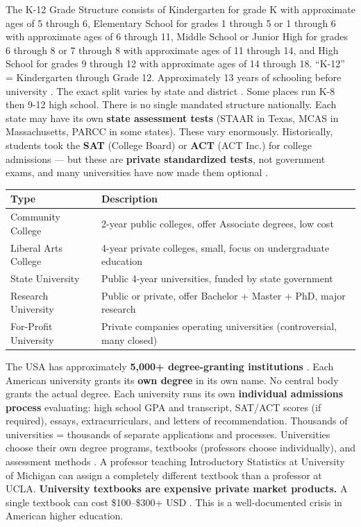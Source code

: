 The K-12 Grade Structure consists of Kindergarten for grade K with approximate ages of 5 through 6, Elementary School for grades 1 through 5 or 1 through 6 with approximate ages of 6 through 11, Middle School or Junior High for grades 6 through 8 or 7 through 8 with approximate ages of 11 through 14, and High School for grades 9 through 12 with approximate ages of 14 through 18. ``K-12'' = Kindergarten through Grade 12. Approximately 13 years of schooling before university \cite{us-ed-gov-k12}. The exact split varies by state and district \cite{us-ed-gov-k12}. Some places run K-8 then 9-12 high school. There is no single mandated structure nationally. Each state may have its own \textbf{state assessment tests} (STAAR in Texas, MCAS in Massachusetts, PARCC in some states). These vary enormously. Historically, students took the \textbf{SAT} (College Board) or \textbf{ACT} (ACT Inc.) for college admissions --- but these are \textbf{private standardized tests}, not government exams, and many universities have now made them optional \cite{sat-act}.

\begin{center}\small
	\begin{tabularx}{0.97\textwidth}{@{} >{\raggedright\arraybackslash}p{3.5cm} X @{}}
		\toprule
		\textbf{Type}         & \textbf{Description}                                                  \\
		\midrule
		Community College     & 2-year public colleges, offer Associate degrees, low cost             \\
		Liberal Arts College  & 4-year private colleges, small, focus on undergraduate education      \\
		State University      & Public 4-year universities, funded by state government                \\
		Research University   & Public or private, offer Bachelor + Master + PhD, major research      \\
		For-Profit University & Private companies operating universities (controversial, many closed) \\
		\bottomrule
	\end{tabularx}
\end{center}

The USA has approximately \textbf{5,000+ degree-granting institutions} \cite{nces-ipeds}. Each American university grants its \textbf{own degree} in its own name. No central body grants the actual degree. Each university runs its own \textbf{individual admissions process} evaluating: high school GPA and transcript, SAT/ACT scores (if required), essays, extracurriculars, and letters of recommendation. Thousands of universities = thousands of separate applications and processes. Universities choose their own degree programs, textbooks (professors choose individually), and assessment methods \cite{nces-ipeds}. A professor teaching Introductory Statistics at University of Michigan can assign a completely different textbook than a professor at UCLA. \textbf{University textbooks are expensive private market products.} A single textbook can cost \$100--\$300+ USD \cite{textbook-cost-crisis}. This is a well-documented crisis in American higher education.

